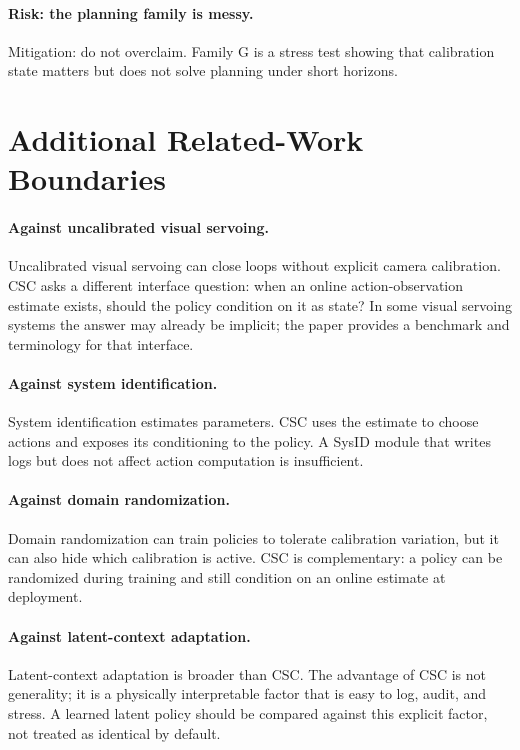 \documentclass{article}
\begin{document}
\paragraph{Risk: the planning family is messy.}
Mitigation: do not overclaim. Family G is a stress test showing that
calibration state matters but does not solve planning under short horizons.

\section{Additional Related-Work Boundaries}

\paragraph{Against uncalibrated visual servoing.}
Uncalibrated visual servoing can close loops without explicit camera
calibration. CSC asks a different interface question: when an online
action-observation estimate exists, should the policy condition on it as
state? In some visual servoing systems the answer may already be implicit; the
paper provides a benchmark and terminology for that interface.

\paragraph{Against system identification.}
System identification estimates parameters. CSC uses the estimate to choose
actions and exposes its conditioning to the policy. A SysID module that writes
logs but does not affect action computation is insufficient.

\paragraph{Against domain randomization.}
Domain randomization can train policies to tolerate calibration variation, but
it can also hide which calibration is active. CSC is complementary: a policy
can be randomized during training and still condition on an online estimate at
deployment.

\paragraph{Against latent-context adaptation.}
Latent-context adaptation is broader than CSC. The advantage of CSC is not
generality; it is a physically interpretable factor that is easy to log, audit,
and stress. A learned latent policy should be compared against this explicit
factor, not treated as identical by default.
\end{document}
